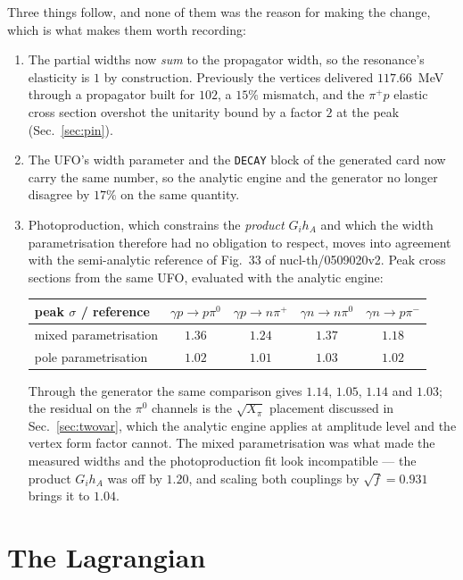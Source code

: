 \documentclass[11pt,a4paper]{article}
\newcommand{\code}[1]{\texttt{\small #1}}
\begin{document}
Three things follow, and none of them was the reason for making the change,
which is what makes them worth recording:
\begin{enumerate}
\item The partial widths now \emph{sum} to the propagator width, so the
resonance's elasticity is $1$ by construction. Previously the vertices delivered
$117.66$~MeV through a propagator built for $102$, a $15\%$ mismatch, and the
$\pi^+p$ elastic cross section overshot the unitarity bound by a factor $2$ at
the peak (Sec.~\ref{sec:pin}).
\item The UFO's width parameter and the \code{DECAY} block of the generated card
now carry the same number, so the analytic engine and the generator no longer
disagree by $17\%$ on the same quantity.
\item Photoproduction, which constrains the \emph{product} $G_ih_A$ and which
the width parametrisation therefore had no obligation to respect, moves into
agreement with the semi-analytic reference of Fig.~33 of nucl-th/0509020v2.
Peak cross sections from the same UFO, evaluated with the analytic engine:
\begin{center}
\begin{tabular}{lcccc}
\toprule
peak $\sigma$ / reference & $\gamma p\to p\pi^0$ & $\gamma p\to n\pi^+$
                          & $\gamma n\to n\pi^0$ & $\gamma n\to p\pi^-$ \\
\midrule
mixed parametrisation & $1.36$ & $1.24$ & $1.37$ & $1.18$ \\
pole parametrisation  & $1.02$ & $1.01$ & $1.03$ & $1.02$ \\
\bottomrule
\end{tabular}
\end{center}
Through the generator the same comparison gives $1.14$, $1.05$, $1.14$ and
$1.03$; the residual on the $\pi^0$ channels is the $\sqrt{X_\pi}$ placement
discussed in Sec.~\ref{sec:twovar}, which the analytic engine applies at
amplitude level and the vertex form factor cannot. The mixed parametrisation was
what made the measured widths and the photoproduction fit look incompatible ---
the product $G_ih_A$ was off by $1.20$, and scaling both couplings by
$\sqrt{f} = 0.931$ brings it to $1.04$.
\end{enumerate}

\section{The Lagrangian}
\end{document}
